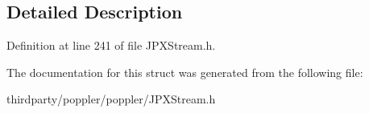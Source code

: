 \subsection{Detailed Description}


Definition at line 241 of file J\+P\+X\+Stream.\+h.



The documentation for this struct was generated from the following file\+:\begin{DoxyCompactItemize}
\item 
thirdparty/poppler/poppler/J\+P\+X\+Stream.\+h\end{DoxyCompactItemize}
